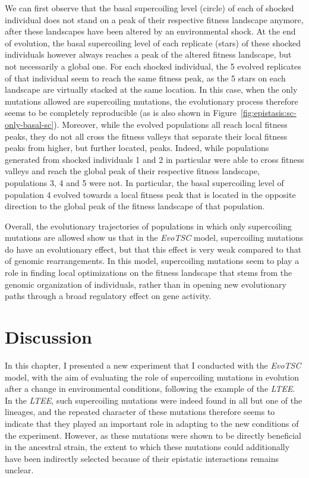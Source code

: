 We can first observe that the basal supercoiling level (circle) of each of shocked individual does not stand on a peak of their respective fitness landscape anymore, after these landscapes have been altered by an environmental shock.
At the end of evolution, the basal supercoiling level of each replicate (stars) of these shocked individuals however always reaches a peak of the altered fitness landscape, but not necessarily a global one.
For each shocked individual, the 5 evolved replicates of that individual seem to reach the same fitness peak, as the 5 stars on each landscape are virtually stacked at the same location.
In this case, when the only mutations allowed are supercoiling mutations, the evolutionary process therefore seems to be completely reproducible (as is also shown in Figure~\ref{fig:epistasis:sc-only-basal-sc}).
Moreover, while the evolved populations all reach local fitness peaks, they do not all cross the fitness valleys that separate their local fitness peaks from higher, but further located, peaks.
Indeed, while populations generated from shocked individuals 1 and 2 in particular were able to cross fitness valleys and reach the global peak of their respective fitness landscape, populations 3, 4 and 5 were not.
In particular, the basal supercoiling level of population 4 evolved towards a local fitness peak that is located in the opposite direction to the global peak of the fitness landscape of that population.

Overall, the evolutionary trajectories of populations in which only supercoiling mutations are allowed show us that in the \emph{EvoTSC} model, supercoiling mutations do have an evolutionary effect, but that this effect is very weak compared to that of genomic rearrangements.
In this model, supercoiling mutations seem to play a role in finding local optimizations on the fitness landscape that stems from the genomic organization of individuals, rather than in opening new evolutionary paths through a broad regulatory effect on gene activity.


\section{Discussion}

In this chapter, I presented a new experiment that I conducted with the \emph{EvoTSC} model, with the aim of evaluating the role of supercoiling mutations in evolution after a change in environmental conditions, following the example of the \emph{LTEE}.
In the \emph{LTEE}, such supercoiling mutations were indeed found in all but one of the lineages, and the repeated character of these mutations therefore seems to indicate that they played an important role in adapting to the new conditions of the experiment.
However, as these mutations were shown to be directly beneficial in the ancestral strain, the extent to which these mutations could additionally have been indirectly selected because of their epistatic interactions remains unclear.

